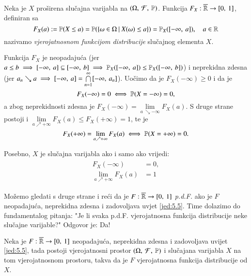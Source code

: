 \begin{defn}    \label{defn:5.4}
    Neka je $X$ pro\v sirena slu\v cajna varijabla na $(\Omega, \: \mathcal{F}, \: \mathbb{P})$.
    Funkcija $F_X : \overline{\mathbb{R}} \to [{0}, \:{1}]$, definiran sa
    \begin{equation*}
        F_X (a) := \mathbb{P} (X \leq a) = \mathbb{P} (\{{\omega \in \Omega} \: | \: {X(\omega) \leq a}\}) = \mathbb{P}_X ([{-\infty}, \:{a}]), \quad a \in \mathbb{R}
    \end{equation*}
    nazivamo \emph{vjerojatnosnom funkcijom distribucije} slu\v cajnog elementa $X$.
\end{defn}

Funkcija $F_X$ je neopadaju\' ca (jer $a \leq b \implies [{-\infty}, \:{a}] \subseteq [{-\infty}, \:{b}] \implies \mathbb{P}_X ([{-\infty}, \:{a}]) \leq \mathbb{P}_X ([{-\infty}, \:{b}]) $) i neprekidna zdesna (jer $a_n \searrow a \implies [{-\infty}, \:{a}] = \bigcap\limits_{n = 1}^{\infty} [{-\infty}, \:{a_n}]$).
Uo\v cimo da je $F_X (-\infty) \geq 0$ i da je
\begin{equation*}
    F_X (-\infty) = 0 \iff \mathbb{P} (X = -\infty) = 0,
\end{equation*}
a zbog neprekidnosti zdesna je $F_X (-\infty) = \lim\limits_{a \ \searrow -\infty} F_X (a)$.
S druge strane postoji i $\lim\limits_{a \nearrow +\infty} F_X (a) \leq F_X(+\infty) = 1$, te je
\begin{equation*}
    F_X(+\infty) = \lim\limits_{a \nearrow +\infty} F_X (a) \iff \mathbb{P} (X = +\infty) = 0.
\end{equation*}

Posebno, $X$ je slu\v cajna varijabla ako i samo ako vrijedi:
\begin{align}    \label{jed:5.5}
    \begin{split}
        F_X(-\infty) &= 0, \\
        \lim\limits_{a \nearrow +\infty} F_X(a) &= 1
    \end{split}
\end{align}

Mo\v zemo gledati s druge strane i re\' ci da je $F: \overline{\mathbb{R}} \to [{0}, \:{1}]$ \emph{p.d.F.} ako je $F$ neopadaju\' ca, neprekidna zdesna i zadovoljava uvjet \eqref{jed:5.5}.
Time dolazimo do fundamentalog pitanja: "Je li svaka p.d.F. vjerojatnosna funkcija distribucije neke slu\v cajne varijable?"
Odgovor je: Da!

\begin{tm}  \label{tm:5.6}
    Neka je $F: \overline{\mathbb{R}} \to [{0}, \:{1}]$ neopadaju\' ca, neprekidna zdesna i zadovoljava uvijet \eqref{jed:5.5}, tada postoji vjerojatnosni prostor $(\Omega, \: \mathcal{F}, \: \mathbb{P})$ i slu\v cajana varijabla $X$ na tom vjerojatnosnom prostoru, takva da je $F$ vjerojatnosna funkcija distribucije od $X$.
\end{tm}

